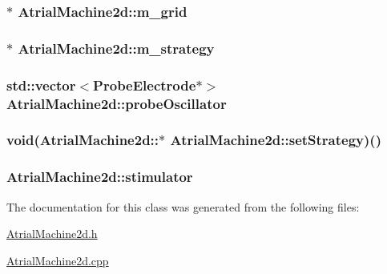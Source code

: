 \hypertarget{class_atrial_machine2d_ae5a4568a32980b04648791e7ac5e3249}{
\subsubsection[{m\+\_\+grid}]{$\ast$ Atrial\+Machine2d\+::m\+\_\+grid}}\label{class_atrial_machine2d_ae5a4568a32980b04648791e7ac5e3249}
\hypertarget{class_atrial_machine2d_afa218ce1cafcf45895c0317953b97977}{
\subsubsection[{m\+\_\+strategy}]{$\ast$ Atrial\+Machine2d\+::m\+\_\+strategy}}\label{class_atrial_machine2d_afa218ce1cafcf45895c0317953b97977}
\hypertarget{class_atrial_machine2d_a524fc9fd5d07a9f6f93611ee7839c99c}{
\subsubsection[{probe\+Oscillator}]{\setlength{\rightskip}{0pt plus 5cm}std\+::vector$<${\bf Probe\+Electrode}$\ast$$>$ Atrial\+Machine2d\+::probe\+Oscillator}}\label{class_atrial_machine2d_a524fc9fd5d07a9f6f93611ee7839c99c}
\hypertarget{class_atrial_machine2d_aaeb0690b1fbd433bd0c25f2162b7b4bb}{
\subsubsection[{set\+Strategy}]{\setlength{\rightskip}{0pt plus 5cm}void(Atrial\+Machine2d\+::$\ast$ Atrial\+Machine2d\+::set\+Strategy)()}}\label{class_atrial_machine2d_aaeb0690b1fbd433bd0c25f2162b7b4bb}
\hypertarget{class_atrial_machine2d_a932f19f3964c0bf8831fa4fc06a85ab6}{
\subsubsection[{stimulator}]{ Atrial\+Machine2d\+::stimulator}}\label{class_atrial_machine2d_a932f19f3964c0bf8831fa4fc06a85ab6}


The documentation for this class was generated from the following files\+:\begin{DoxyCompactItemize}
\item 
\hyperlink{_atrial_machine2d_8h}{Atrial\+Machine2d.\+h}\item 
\hyperlink{_atrial_machine2d_8cpp}{Atrial\+Machine2d.\+cpp}\end{DoxyCompactItemize}
